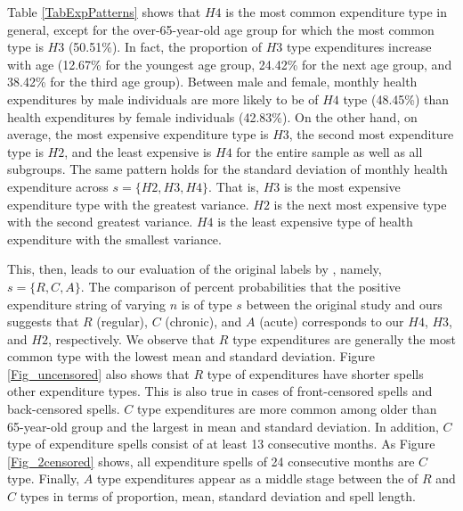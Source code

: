 \documentclass[letterpaper,12pt]{article}
\theoremstyle{definition}
\begin{document}
\begin{spacing}{1.5}{}
  Table \ref{TabExpPatterns} shows that $H4$ is the most common expenditure type in general, except for the over-65-year-old age group for which the most common type is $H3$ (50.51\%). In fact, the proportion of $H3$ type expenditures increase with age (12.67\% for the youngest age group, 24.42\% for the next age group, and 38.42\% for the third age group). Between male and female, monthly health expenditures by male individuals are more likely to be of $H4$ type (48.45\%) than health expenditures by female individuals (42.83\%). On the other hand, on average, the most expensive expenditure type is $H3$, the second most expenditure type is $H2$, and the least expensive is $H4$ for the entire sample as well as all subgroups. The same pattern holds for the standard deviation of monthly health expenditure across $s = \{H2, H3, H4\}$. That is, $H3$ is the most expensive expenditure type with the greatest variance. $H2$ is the next most expensive type with the second greatest variance. $H4$ is the least expensive type of health expenditure with the smallest variance.\par
  
  This, then, leads to our evaluation of the original labels by \citet{evans}, namely, $s = \{R, C, A\}$. The comparison of percent probabilities that the positive expenditure string of varying $n$ is of type $s$ between the original study and ours suggests that $R$ (regular), $C$ (chronic), and $A$ (acute) corresponds to our $H4$, $H3$, and $H2$, respectively. We observe that $R$ type expenditures are generally the most common type with the lowest mean and standard deviation. Figure \ref{Fig_uncensored} also shows that $R$ type of expenditures have shorter spells other expenditure types. This is also true in cases of front-censored spells and back-censored spells. $C$ type expenditures are more common among older than 65-year-old group and the largest in mean and standard deviation. In addition, $C$ type of expenditure spells consist of at least 13 consecutive months. As Figure \ref{Fig_2censored} shows, all expenditure spells of 24 consecutive months are $C$ type. Finally, $A$ type expenditures appear as a middle stage between the of $R$ and $C$ types in terms of proportion, mean, standard deviation and spell length.
  

\end{spacing}
\end{document}
